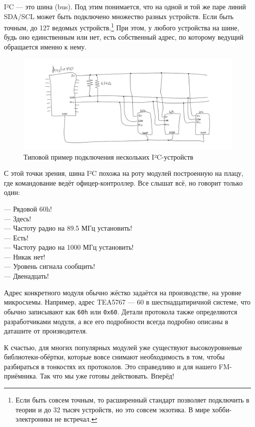 I²C — это шина (bus). Под этим понимается, что на одной и той же паре линий SDA/SCL может быть подключено множество разных устройств. Если быть точным, до 127 ведомых устройств.\footnote{Если быть совсем точным, то расширенный стандарт позволяет подключить в теории и до 32 тысяч устройств, но это совсем экзотика. В мире хобби-электроники не встречал.} При этом, у любого устройства на шине, будь оно единственным или нет, есть собственный адрес, по которому ведущий обращается именно к нему.

\begin{figure}
  \centering
  \includegraphics{sketches/i2c-multiple}
  \caption{Типовой пример подключения нескольких I²C-устройств}
\end{figure}

С этой точки зрения, шина I²C похожа на роту модулей построенную на плацу, где командование ведёт офицер-контроллер. Все слышат всё, но говорит только один:

— Рядовой 60h!\\
— Здесь!\\
— Частоту радио на 89.5 МГц установить!\\
— Есть!\\
— Частоту радио на 1000 МГц установить!\\
— Никак нет!\\
— Уровень сигнала сообщить!\\
— Двенадцать!

Адрес конкретного модуля обычно жёстко задаётся на производстве, на уровне микросхемы. Например, адрес TEA5767 — 60 в шестнадцатиричной системе, что обычно записывают как \texttt{60h} или \texttt{0x60}.  Детали протокола также определяются разработчиками модуля, а все его подробности всегда подробно описаны в даташите от производителя.

К счастью, для многих популярных модулей уже существуют высокоуровневые библиотеки-обёртки, которые вовсе снимают необходимость в том, чтобы разбираться в тонкостях их протоколов. Это справедливо и для нашего FM-приёмника. Так что мы уже готовы действовать. Вперёд!

